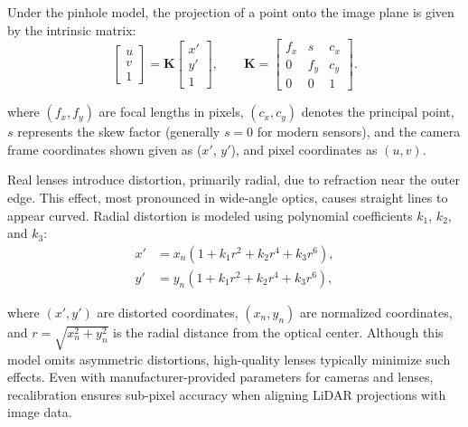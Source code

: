 \documentclass{erauthesis}
\begin{document}
Under the pinhole model, the projection of a point onto the image plane is given by the intrinsic matrix:
\begin{equation} \label{K_matrix}
\begin{bmatrix} u \\ v \\ 1 \end{bmatrix}
=
\mathbf{K}
\begin{bmatrix} x' \\ y' \\ 1 \end{bmatrix},
\qquad
\mathbf{K} =
\begin{bmatrix}
f_x & s & c_x \\
0   & f_y & c_y \\
0   & 0   & 1
\end{bmatrix}.
\end{equation}


where $(f_x, f_y)$ are focal lengths in pixels, $(c_x, c_y)$ denotes the principal point, $s$ represents the skew factor (generally $s=0$ for modern sensors), and the camera frame coordinates shown given as ($x'$, $y'$), and pixel coordinates as $(u,v)$.

Real lenses introduce distortion, primarily radial, due to refraction near the outer edge.  
This effect, most pronounced in wide-angle optics, causes straight lines to appear curved.  
Radial distortion is modeled using polynomial coefficients $k_1$, $k_2$, and $k_3$:
\begin{equation}
    \begin{split}
        x' &= x_n(1 + k_1 r^2 + k_2 r^4 + k_3 r^6), \\
        y' &= y_n(1 + k_1 r^2 + k_2 r^4 + k_3 r^6),
    \end{split}
\end{equation}


where $(x', y')$ are distorted coordinates, $(x_n, y_n)$ are normalized coordinates, and $r = \sqrt{x_n^2 + y_n^2}$ is the radial distance from the optical center.  
Although this model omits asymmetric distortions, high-quality lenses typically minimize such effects.  
Even with manufacturer-provided parameters for cameras and lenses, recalibration ensures sub-pixel accuracy when aligning \ac{LiDAR} projections with image data.
\end{document}
